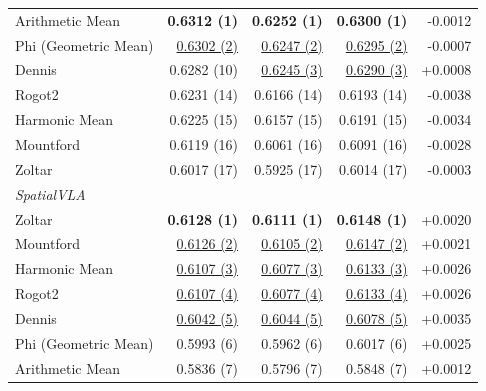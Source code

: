 \begin{table}[t]
{\begin{tabular}{lrrrr}
Arithmetic Mean & \textbf{0.6312 (1)} & \textbf{0.6252 (1)} & \textbf{0.6300 (1)} & -0.0012 \\
Phi (Geometric Mean) & \underline{0.6302 (2)} & \underline{0.6247 (2)} & \underline{0.6295 (2)} & -0.0007 \\
Dennis & 0.6282 (10) & \underline{0.6245 (3)} & \underline{0.6290 (3)} & +0.0008 \\
Rogot2 & 0.6231 (14) & 0.6166 (14) & 0.6193 (14) & -0.0038 \\
Harmonic Mean & 0.6225 (15) & 0.6157 (15) & 0.6191 (15) & -0.0034 \\
Mountford & 0.6119 (16) & 0.6061 (16) & 0.6091 (16) & -0.0028 \\
Zoltar & 0.6017 (17) & 0.5925 (17) & 0.6014 (17) & -0.0003 \\
\midrule
\multicolumn{5}{l}{\textit{SpatialVLA}} \\
Zoltar & \textbf{0.6128 (1)} & \textbf{0.6111 (1)} & \textbf{0.6148 (1)} & +0.0020 \\
Mountford & \underline{0.6126 (2)} & \underline{0.6105 (2)} & \underline{0.6147 (2)} & +0.0021 \\
Harmonic Mean & \underline{0.6107 (3)} & \underline{0.6077 (3)} & \underline{0.6133 (3)} & +0.0026 \\
Rogot2 & \underline{0.6107 (4)} & \underline{0.6077 (4)} & \underline{0.6133 (4)} & +0.0026 \\
Dennis & \underline{0.6042 (5)} & \underline{0.6044 (5)} & \underline{0.6078 (5)} & +0.0035 \\
Phi (Geometric Mean) & 0.5993 (6) & 0.5962 (6) & 0.6017 (6) & +0.0025 \\
Arithmetic Mean & 0.5836 (7) & 0.5796 (7) & 0.5848 (7) & +0.0012 \\
\bottomrule
\end{tabular}
}
\end{table}
